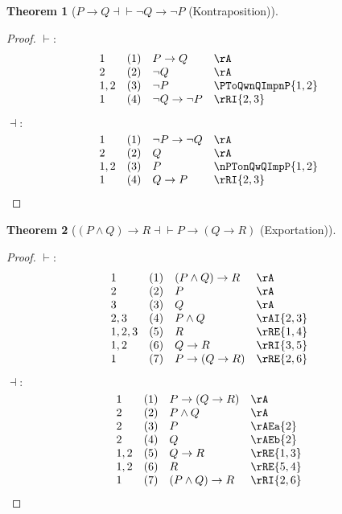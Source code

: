 \documentclass{book}
\theoremstyle{plain}
\newtheorem{theorem}{Theorem}
\theoremstyle{remark}
\theoremstyle{definition}
\begin{document}
\label{PToQEqvnQTonP}
\begin{theorem}[\( P \rightarrow Q \dashv\vdash \neg Q \rightarrow \neg P \) (Kontraposition)]
\end{theorem}
\begin{proof}
	\(\vdash:\)
	\[
	\begin{array}{llll}
		1 & (1) & P \rightarrow Q & \rA \\
		2 & (2) & \neg Q & \rA \\
		1,2 & (3) & \neg P & \PToQwnQImpnP{1,2} \\
		1 & (4) & \neg Q\rightarrow \neg P & \rRI{2,3} \\
	\end{array}		
	\]
	
	\(\dashv:\)
	\[
	\begin{array}{llll}
		1 & (1) & \neg P \rightarrow \neg Q & \rA \\
		2 & (2) & Q & \rA \\
		1,2 & (3) & P & \nPTonQwQImpP{1,2} \\
		1 & (4) & Q\rightarrow P & \rRI{2,3} \\
	\end{array}		
	\]
\end{proof}


\label{LpPAndQRpToREqvPToLpQToRRp}
\begin{theorem}[\( (P \land Q) \rightarrow R \dashv\vdash P\rightarrow (Q\rightarrow R) \) (Exportation)]
\end{theorem}
\begin{proof}
	\(\vdash:\)
	\[
	\begin{array}{llll}
		1 & (1) & (P \land Q) \rightarrow R & \rA \\
		2 & (2) & P & \rA \\
		3 & (3) & Q & \rA \\
		2,3 & (4) & P\land Q & \rAI{2,3} \\
		1,2,3 & (5) & R & \rRE{1,4} \\
		1,2 & (6) & Q\rightarrow R & \rRI{3,5} \\
		1 & (7) & P\rightarrow (Q\rightarrow R) & \rRE{2,6} \\
	\end{array}		
	\]
	
	\(\dashv:\)
	\[
	\begin{array}{llll}
		1 & (1) & P\rightarrow (Q\rightarrow R) & \rA \\
		2 & (2) & P\land Q & \rA \\
		2 & (3) & P & \rAEa{2} \\
		2 & (4) & Q & \rAEb{2} \\
		1,2 & (5) & Q\rightarrow R & \rRE{1,3} \\
		1,2 & (6) & R & \rRE{5,4} \\
		1 & (7) & (P\land Q)\rightarrow R & \rRI{2,6} \\
	\end{array}		
	\]
\end{proof}
\end{document}
